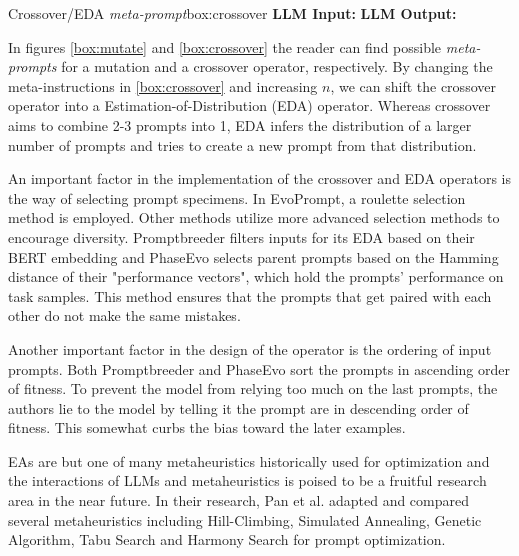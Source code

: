 \begin{figurebox}{Crossover/EDA \textit{meta-prompt}}{box:crossover}
    \textbf{LLM Input:} 
    \textbf{LLM Output:}
\end{figurebox}

In figures \ref{box:mutate} and \ref{box:crossover} the reader can find possible \textit{meta-prompts} for a mutation and a crossover operator, respectively.
By changing the meta-instructions in \ref{box:crossover} and increasing $n$, we can shift the crossover operator into a Estimation-of-Distribution (EDA)
operator. Whereas crossover aims to combine 2-3 prompts into 1, EDA infers the distribution of a larger number of prompts and tries to 
create a new prompt from that distribution. 

An important factor in the implementation of the crossover and EDA operators is the way of selecting prompt specimens.
In EvoPrompt\cite{guo2024connectinglargelanguagemodels}, a roulette selection method is employed. Other methods utilize more advanced
selection methods to encourage diversity. Promptbreeder\cite{fernando2023promptbreederselfreferentialselfimprovementprompt} filters inputs
for its EDA based on their BERT embedding and PhaseEvo\cite{cui2024phaseevounifiedincontextprompt} selects parent prompts
based on the Hamming distance of their "performance vectors", which hold the prompts' performance on task samples.  
This method ensures that the prompts that get paired with each other do not make the same mistakes.

Another important factor in the design of the operator is the ordering of input prompts. Both Promptbreeder and PhaseEvo sort 
the prompts in ascending order of fitness. To prevent the model from relying too much on the last prompts, the authors
lie to the model by telling it the prompt are in descending order of fitness. 
This somewhat curbs the bias toward the later examples\cite{fernando2023promptbreederselfreferentialselfimprovementprompt}.

EAs are but one of many metaheuristics historically used for optimization and the 
interactions of LLMs and metaheuristics is poised to be a fruitful research area in the near future.
In their research, Pan et al.\cite{pan2024plumpromptlearningusing} adapted and compared several metaheuristics
including Hill-Climbing, Simulated Annealing, Genetic Algorithm, Tabu Search and Harmony Search for prompt optimization.


